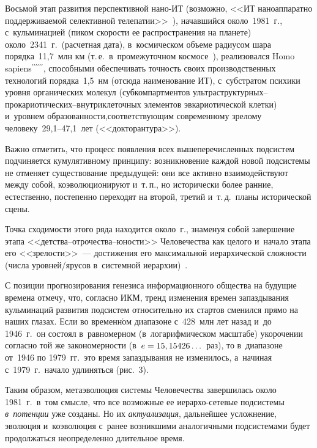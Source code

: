 \begin{multicols}{2}
  Восьмой этап развития перспективной нано-ИТ (возможно, <<ИТ 
наноаппаратно поддерживаемой селективной телепатии>>~\cite{16-grn}), 
начавшийся около~1981~г., с~кульминацией (пиком скорости ее 
распространения на планете) около~2341~г.\ (расчетная дата), в~космическом 
объеме радиусом шара порядка~11,7~млн км (т.\,е.\ в~промежуточном 
космосе~\cite{5-grn}), реализовался {Homo 
sapiens}$^{\prime\prime\prime\prime\prime\prime }$, способными обеспечивать 
точность своих производственных технологий порядка~1,5~нм (отсюда 
наименование ИТ), с~субстратом психики уровня органических молекул 
(субкомпартментов ульт\-ра\-струк\-тур\-ных--про\-ка\-риоти\-че\-ских--внут\-ри\-кле\-точ\-ных 
элементов эвкариотической клетки) и~уровнем 
об\-ра\-зо\-ван\-ности,\linebreak соответству\-ющим современному зрелому  
человеку~29,1--47,1~лет (<<докторантура>>).
  
  Важно отметить, что процесс появления всех вышеперечисленных 
подсистем подчиняется кумулятивному принципу: возникновение каждой 
новой подсистемы не отменяет существование предыду\-щей: они все активно 
взаимодействуют между собой, коэволюционируют и~т.\,п., но исторически 
более ранние, естественно, постепенно переходят на второй, третий и~т.\,д.\ 
планы исторической сцены.
  
  Точка сходимости этого ряда находится около~г., знаменуя собой 
завершение этапа <<детст\-ва--от\-ро\-че\-ст\-ва--юности>> Человечества как 
целого и~начало этапа его <<зрелости>>~--- до\-сти\-же\-ния его максималь\-ной 
иерархической слож\-ности (чис\-ла уров\-ней/яру\-сов в~сис\-тем\-ной 
иерархии)~\cite{5-grn, 7-grn}.
  
  С позиции прогнозирования генезиса информационного общества на 
будущие времена отмечу, что, согласно ИКМ, тренд изменения времен 
запаздывания кульминаций развития под\-сис\-тем относительно их стартов 
сменился прямо на наших глазах. Если во временн$\acute{\mbox{о}}$м диапазоне с~428~млн 
лет назад и~до 1946~г.\ он со\-стоял в~равномерном (в~логарифмическом 
масштабе) укорочении согласно той же за\-ко\-но\-мер\-ности 
(в~$e\hm=15,15426\ldots$~раз), то в~диапазоне от~1946 по 1979~гг.\ это время 
запаздывания не изменилось, а~начиная с~1979~г.\ начало удлиняться 
(рис.~3). 
  

  
  Таким образом, метаэволюция сис\-те\-мы Человечества завершилась около 
1981~г.\ в~том смыс\-ле, что все воз\-мож\-ные ее ие\-рар\-хо-се\-те\-вые под\-сис\-те\-мы 
\textit{в~потенции} уже созданы. Но их \textit{актуализация}, дальнейшее 
услож\-не\-ние, эволюция и~коэволюция с~ранее возникшими аналогичными 
под\-сис\-те\-ма\-ми будет продолжаться неопределенно длительное время.


\end{multicols}
